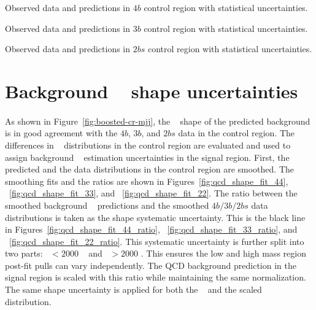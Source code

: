 \begin{table}[htb!]
\begin{center}
\caption{Observed data and predictions in $4b$ control region with statistical uncertainties.}

\label{tab:Tab_4b_CR_Variations}
\end{center}
\end{table}

\begin{table}[htb!]
\begin{center}
\caption{Observed data and predictions in $3b$ control region with statistical uncertainties.}

\label{tab:Tab_3b_CR_Variations}
\end{center}
\end{table}

\begin{table}[htb!]
\begin{center}
\caption{Observed data and predictions in $2bs$ control region with statistical uncertainties.}

\label{tab:Tab_2bs_CR_Variations}
\end{center}
\end{table}

\section{Background \mtwoJ~ shape uncertainties}
\label{sec:unc-shape-qcd-in-sr}
\paragraph{}
As shown in Figure~\ref{fig:boosted-cr-mjj}, the \mtwoJ~ shape of the predicted background is in good agreement with the $4b$, $3b$, and $2bs$ data in the control region.
The differences in \mtwoJ~ distributions in the control region are evaluated and used to assign background \mtwoJ~ estimation uncertainties in the signal region. 
First, the predicted and the data distributions in the control region are smoothed.
The smoothing fits and the ratios are shown in Figures~\ref{fig:qcd_shape_fit_44}, ~\ref{fig:qcd_shape_fit_33}, and ~\ref{fig:qcd_shape_fit_22}.
The ratio between the smoothed background \mtwoJ~ predictions and the smoothed $4b/3b/2bs$ data \mtwoJ~ distributions is taken as the shape systematic uncertainty.
This is the black line in Figures~\ref{fig:qcd_shape_fit_44_ratio}, ~\ref{fig:qcd_shape_fit_33_ratio}, and ~\ref{fig:qcd_shape_fit_22_ratio}.
This systematic uncertainty is further split into two parts: \mtwoJ~$< 2000$ \GeV~ and \mtwoJ~$> 2000$ \GeV.
This ensures the low and high mass region post-fit pulls can vary independently.
The QCD background prediction in the signal region is scaled with this ratio while maintaining the same normalization.
The same shape uncertainty is applied for both the \mtwoJ~ and the scaled \mtwoJ~ distribution. 

